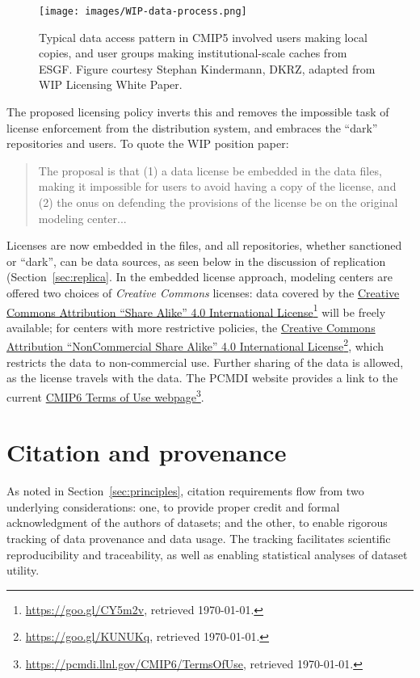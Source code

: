 \documentclass[gmd,manuscript]{copernicus}
\newcommand{\pllabel}[1]{\label{p-#1}\linelabel{l-#1}}
\newcommand{\urlref}[2] {\href{#1}{#2}\footnote{\url{#1}, retrieved \today.}}
\begin{document}
\begin{figure*}
  \begin{center}
    \texttt{[image: images/WIP-data-process.png]}
  \end{center}
  \caption{Typical data access pattern in CMIP5 involved users making
    local copies, and user groups making institutional-scale caches
    from ESGF. Figure courtesy Stephan Kindermann, DKRZ, adapted from
    WIP Licensing White Paper.}
  \label{fig:dark}
\end{figure*}

The proposed licensing policy inverts this and removes the impossible
task of license enforcement from the distribution system, and embraces
the ``dark'' repositories and users. To quote the WIP position paper:

\begin{quote}
  The proposal is that (1) a data license be embedded in the data
  files, making it impossible for users to avoid having a copy of the
  license, and (2) the onus on defending the provisions of the license
  be on the original modeling center...
\end{quote}

\pllabel{RC2-27}
Licenses are now embedded in the files, and all repositories, whether
sanctioned or ``dark'', can be data sources, as seen below in the
discussion of replication (Section~\ref{sec:replica}.
\pllabel{RC2-30}
In the embedded license approach, modeling centers are offered two
choices of \emph{Creative Commons} licenses: data covered by the
\urlref{https://goo.gl/CY5m2v}{Creative Commons Attribution ``Share
  Alike'' 4.0 International License} will be freely available; for
centers with more restrictive policies, the
\urlref{https://goo.gl/KUNUKq}{Creative Commons Attribution
  ``NonCommercial Share Alike'' 4.0 International License}, which
restricts the data to non-commercial use. Further sharing of the data
is allowed, as the license travels with the data. The PCMDI website
provides a link to the current
\urlref{https://pcmdi.llnl.gov/CMIP6/TermsOfUse}{CMIP6 Terms of Use
  webpage}.

\section{Citation and provenance}
\label{sec:cite}

As noted in Section~\ref{sec:principles}, citation requirements flow
from two underlying considerations: one, to provide proper credit and
formal acknowledgment of the authors of datasets; and the other, to
enable rigorous tracking of data provenance and data usage. The
tracking facilitates scientific reproducibility and traceability, as
well as enabling statistical analyses of dataset utility.
\end{document}
